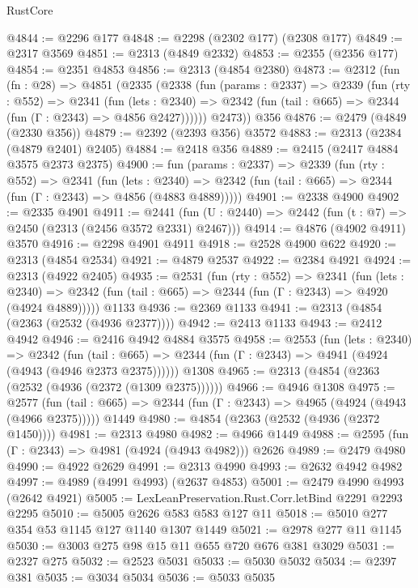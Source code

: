 \begin{lexlean}{RustCore}
\begin{coremodule}
@4844 := @2296 @177
@4848 := @2298 (@2302 @177) (@2308 @177)
@4849 := @2317 @3569
@4851 := @2313 (@4849 @2332)
@4853 := @2355 (@2356 @177)
@4854 := @2351 @4853
@4856 := @2313 (@4854 @2380)
@4873 := @2312
    (fun (fn : @28) =>
    @4851
      (@2335
        (@2338
          (fun (params : @2337) =>
          @2339
            (fun (rty : @552) =>
            @2341
              (fun (lets : @2340) =>
              @2342 (fun (tail : @665) => @2344 (fun (Γ : @2343) => @4856 @2427))))))
        @2473))
    @356
@4876 := @2479 (@4849 (@2330 @356))
@4879 := @2392 (@2393 @356) @3572
@4883 := @2313 (@2384 (@4879 @2401) @2405)
@4884 := @2418 @356
@4889 := @2415 (@2417 @4884 @3575 @2373 @2375)
@4900 := fun (params : @2337) =>
  @2339
    (fun (rty : @552) =>
    @2341
      (fun (lets : @2340) =>
      @2342 (fun (tail : @665) => @2344 (fun (Γ : @2343) => @4856 (@4883 @4889)))))
@4901 := @2338 @4900
@4902 := @2335 @4901
@4911 := @2441 (fun (U : @2440) => @2442 (fun (t : @7) => @2450 (@2313 (@2456 @3572 @2331) @2467)))
@4914 := @4876 (@4902 @4911) @3570
@4916 := @2298 @4901 @4911
@4918 := @2528 @4900 @622
@4920 := @2313 (@4854 @2534)
@4921 := @4879 @2537
@4922 := @2384 @4921
@4924 := @2313 (@4922 @2405)
@4935 := @2531
    (fun (rty : @552) =>
    @2341
      (fun (lets : @2340) =>
      @2342 (fun (tail : @665) => @2344 (fun (Γ : @2343) => @4920 (@4924 @4889)))))
    @1133
@4936 := @2369 @1133
@4941 := @2313 (@4854 (@2363 (@2532 (@4936 @2377))))
@4942 := @2413 @1133
@4943 := @2412 @4942
@4946 := @2416 @4942 @4884 @3575
@4958 := @2553
    (fun (lets : @2340) =>
    @2342
      (fun (tail : @665) => @2344 (fun (Γ : @2343) => @4941 (@4924 (@4943 (@4946 @2373 @2375))))))
    @1308
@4965 := @2313 (@4854 (@2363 (@2532 (@4936 (@2372 (@1309 @2375))))))
@4966 := @4946 @1308
@4975 := @2577
    (fun (tail : @665) => @2344 (fun (Γ : @2343) => @4965 (@4924 (@4943 (@4966 @2375)))))
    @1449
@4980 := @4854 (@2363 (@2532 (@4936 (@2372 @1450))))
@4981 := @2313 @4980
@4982 := @4966 @1449
@4988 := @2595 (fun (Γ : @2343) => @4981 (@4924 (@4943 @4982))) @2626
@4989 := @2479 @4980
@4990 := @4922 @2629
@4991 := @2313 @4990
@4993 := @2632 @4942 @4982
@4997 := @4989 (@4991 @4993) (@2637 @4853)
@5001 := @2479 @4990 @4993 (@2642 @4921)
@5005 := LexLeanPreservation.Rust.Corr.letBind @2291 @2293 @2295
@5010 := @5005 @2626 @583 @583 @127 @11
@5018 := @5010 @277 @354 @53 @1145 @127 @1140 @1307 @1449
@5021 := @2978 @277 @11 @1145
@5030 := @3003 @275 @98 @15 @11 @655 @720 @676 @381 @3029
@5031 := @2327 @275
@5032 := @2523 @5031
@5033 := @5030 @5032
@5034 := @2397 @381
@5035 := @3034 @5034
@5036 := @5033 @5035

\end{coremodule}
\end{lexlean}
